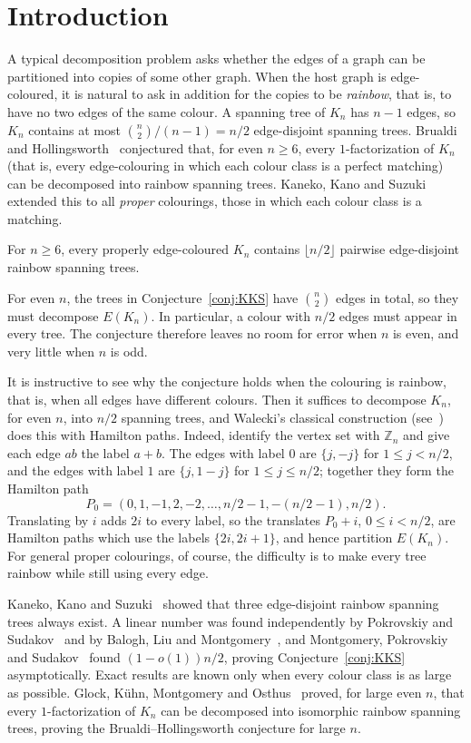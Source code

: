 \section{Introduction}\label{sec:intro}
A typical decomposition problem asks whether the edges of a graph can be partitioned into copies of some other graph.
When the host graph is edge-coloured, it is natural to ask in addition for the copies to be \emph{rainbow}, that is, to have no two edges of the same colour.
A spanning tree of $K_n$ has $n-1$ edges, so $K_n$ contains at most $\binom n2/(n-1)=n/2$ edge-disjoint spanning trees.
Brualdi and Hollingsworth~\cite{BH} conjectured that, for even $n\ge 6$, every $1$-factorization of $K_n$ (that is, every edge-colouring in which each colour class is a perfect matching) can be decomposed into rainbow spanning trees.
Kaneko, Kano and Suzuki~\cite{KKS} extended this to all \emph{proper} colourings, those in which each colour class is a matching.

\begin{conjecture}\label{conj:KKS}
For $n\ge 6$, every properly edge-coloured $K_n$ contains $\lfloor n/2\rfloor$ pairwise edge-disjoint rainbow spanning trees.
\end{conjecture}

For even $n$, the trees in Conjecture~\ref{conj:KKS} have $\binom n2$ edges in total, so they must decompose $E(K_n)$.
In particular, a colour with $n/2$ edges must appear in every tree.
The conjecture therefore leaves no room for error when $n$ is even, and very little when $n$ is odd.

It is instructive to see why the conjecture holds when the colouring is rainbow, that is, when all edges have different colours.
Then it suffices to decompose $K_n$, for even $n$, into $n/2$ spanning trees, and Walecki's classical construction (see~\cite{Als}) does this with Hamilton paths.
Indeed, identify the vertex set with $\mathbb Z_n$ and give each edge $ab$ the label $a+b$.
The edges with label $0$ are $\{j,-j\}$ for $1\le j<n/2$, and the edges with label $1$ are $\{j,1-j\}$ for $1\le j\le n/2$; together they form the Hamilton path
\[
P_0=(0,1,-1,2,-2,\dots,n/2-1,-(n/2-1),n/2).
\]
Translating by $i$ adds $2i$ to every label, so the translates $P_0+i$, $0\le i<n/2$, are Hamilton paths which use the labels $\{2i,2i+1\}$, and hence partition $E(K_n)$.
For general proper colourings, of course, the difficulty is to make every tree rainbow while still using every edge.

Kaneko, Kano and Suzuki~\cite{KKS} showed that three edge-disjoint rainbow spanning trees always exist.
A linear number was found independently by Pokrovskiy and Sudakov~\cite{PS} and by Balogh, Liu and Montgomery~\cite{BLM}, and Montgomery, Pokrovskiy and Sudakov~\cite{MPS} found $(1-o(1))n/2$, proving Conjecture~\ref{conj:KKS} asymptotically.
Exact results are known only when every colour class is as large as possible.
Glock, K\"uhn, Montgomery and Osthus~\cite{GKMO} proved, for large even $n$, that every $1$-factorization of $K_n$ can be decomposed into isomorphic rainbow spanning trees, proving the Brualdi--Hollingsworth conjecture for large $n$.


